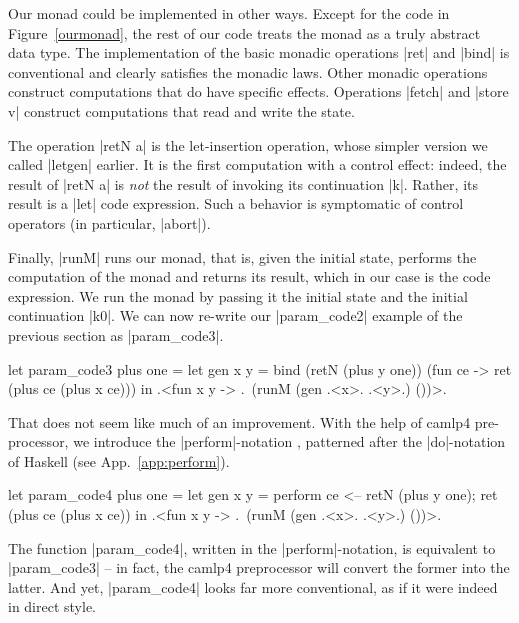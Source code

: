 \documentclass[draft]{elsart}
\begin{document}
Our monad could be implemented in other ways. Except for the code in
Figure~\ref{ourmonad}, the rest of our code treats the monad as a
truly abstract data type. The implementation of the basic monadic
operations |ret| and |bind| is conventional and clearly satisfies the
monadic laws. Other monadic operations construct computations that do
have specific effects.  Operations |fetch| and |store v| construct
computations that read and write the state.

The operation |retN a| is the let-insertion operation, whose simpler
version we called |letgen| earlier. It is the first computation with
a control effect: indeed, the result of |retN a| is \emph{not} the
result of invoking its continuation |k|. Rather, its result is a |let|
code expression. Such a behavior is symptomatic of control operators
(in particular, |abort|).

Finally, |runM| runs our monad, that is, given the initial state,
performs the computation of
the monad and returns its result, which in our case is the code
expression. We run the monad by passing it the initial state and the
initial continuation |k0|. We can now re-write our |param_code2|
example of the previous section as |param_code3|.
\begin{code}
let param_code3 plus one =
  let gen x y = bind (retN (plus y one)) (fun ce -> 
                ret (plus ce (plus x ce)))
  in .<fun x y -> .~(runM (gen .<x>. .<y>.) ())>.
\end{code}
%
That does not seem like much of an improvement. With the help of
camlp4 pre-processor, we introduce the |perform|-notation \cite{metamonadsURL},
patterned after the |do|-notation of Haskell (see App.~\ref{app:perform}).
\begin{code}
let param_code4 plus one =
  let gen x y = perform ce <-- retN (plus y one);
                        ret (plus ce (plus x ce))
  in .<fun x y -> .~(runM (gen .<x>. .<y>.) ())>.
\end{code}
The function
|param_code4|, written in the |perform|-notation, is equivalent to
|param_code3| -- in fact, the camlp4 preprocessor will convert the
former into the latter. And yet, |param_code4| looks far more
conventional, as if it were indeed in direct style.
\end{document}

